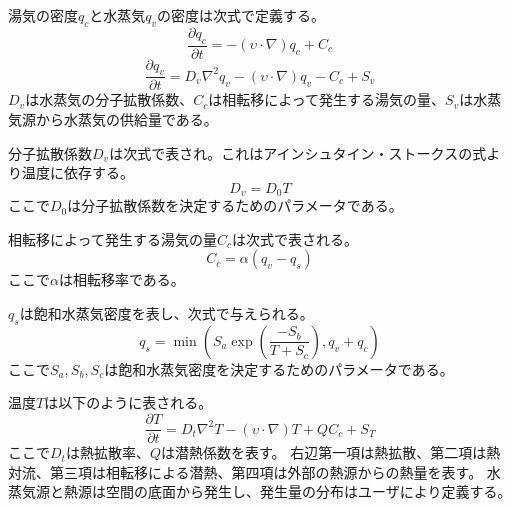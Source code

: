 湯気の密度$q_{c}$と水蒸気$q_{v}$の密度は次式で定義する。
\begin{equation}
\label{steam}
\frac{\partial q_{c}}{\partial t} = -(\upsilon \cdot \nabla)q_{c} + C_{c}
\end{equation}
\begin{equation}
\label{vapor}
\frac{\partial q_{v}}{\partial t} = D_{v}\nabla^2q_{v}-(\upsilon \cdot \nabla)q_{v} - C_{c} + S_{v}
\end{equation}
$D_{v}$は水蒸気の分子拡散係数、$C_{c}$は相転移によって発生する湯気の量、$S_{v}$は水蒸気源から水蒸気の供給量である。

分子拡散係数$D_{v}$は次式で表され。これはアインシュタイン・ストークスの式より温度に依存する。
\begin{equation}
\label{diffusion}
D_{v}=D_{0}T
\end{equation}
ここで$D_{0}$は分子拡散係数を決定するためのパラメータである。

相転移によって発生する湯気の量$C_{c}$は次式で表される。
\begin{equation}
\label{transition}
C_{c} = \alpha(q_{v}-q_{s})
\end{equation}
ここで$\alpha$は相転移率である。

$q_{s}$は飽和水蒸気密度を表し、次式で与えられる。	
\begin{equation}
\label{saturation}
q_{s} = \min\left(S_{a} \exp\left(\frac{-S_{b}}{T+S_{c}}\right),q_{v}+q_{c}\right)
\end{equation}
ここで$S_{a},S_{b},S_{c}$は飽和水蒸気密度を決定するためのパラメータである。

温度$T$は以下のように表される。
\begin{equation}
\label{temperature}
\frac{\partial T}{\partial t} = D_{t}\nabla^2T- (\upsilon \cdot \nabla)T +  QC_{c} + S_{T}
\end{equation}
ここで$D_{t}$は熱拡散率、$Q$は潜熱係数を表す。
右辺第一項は熱拡散、第二項は熱対流、第三項は相転移による潜熱、第四項は外部の熱源からの熱量を表す。
水蒸気源と熱源は空間の底面から発生し、発生量の分布はユーザにより定義する。


